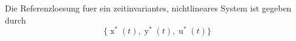 Die Referenzloesung fuer ein zeitinvariantes, nichtlineares System ist gegeben durch
$$\{\operatorname{x}^*(t), \operatorname{y}^*(t), \operatorname{u}^*(t)\}$$
